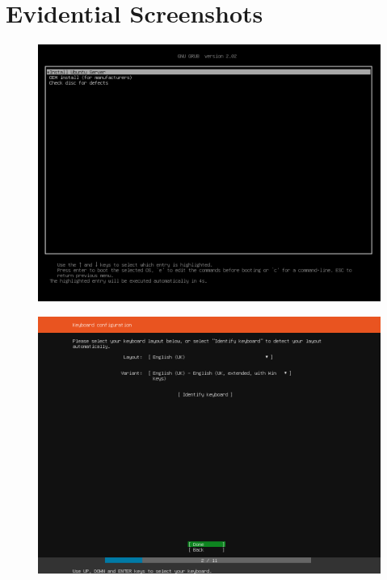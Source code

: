 \section{Evidential Screenshots}
\begin{figure}[h!]
\centering
\captionsetup{skip=\skipfigurecaptionlen}
\includegraphics[width=1\textwidth]{screenshots/IY2D502-2019-02-21-19-15-19.png}
\caption{}
\label{fig:IY2D502-2019-02-21-19-15-19}
\end{figure}
\pagebreak
\begin{figure}[h!]
\centering
\captionsetup{skip=\skipfigurecaptionlen}
\includegraphics[width=1\textwidth]{screenshots/IY2D502-2019-02-21-19-16-03.png}
\caption{}
\label{fig:IY2D502-2019-02-21-19-16-03}
\end{figure}
